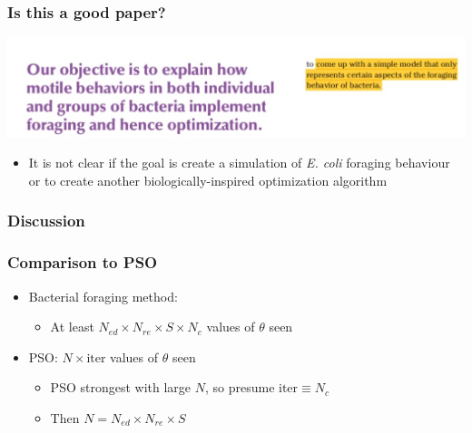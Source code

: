 \documentclass{beamer}
\begin{document}
\begin{frame}
\frametitle{Is this a good paper?}
\begin{center}
\includegraphics[scale=0.3]{assets/yikes}
\end{center}
\begin{itemize}
  \item<2-> It is not clear if the goal is create a simulation of \textit{E. coli} foraging behaviour or to create another biologically-inspired optimization algorithm
\end{itemize}
\end{frame}

\begin{frame}
\frametitle{Discussion}
\end{frame}

\begin{frame}
\frametitle{Comparison to PSO}
\begin{itemize}
  \item Bacterial foraging method:
  \begin{itemize}
    \item   At least $N_{ed} \times N_{re} \times S \times N_c$ values of $\theta$ seen
  \end{itemize}
  \item PSO: $N \times \text{iter}$ values of $\theta$ seen
  \begin{itemize}
    \item PSO strongest with large $N$, so presume $\text{iter} \equiv N_c$
    \item Then $N = N_{ed} \times N_{re} \times S$
  \end{itemize}
\end{itemize}
\end{frame}
\end{document}
